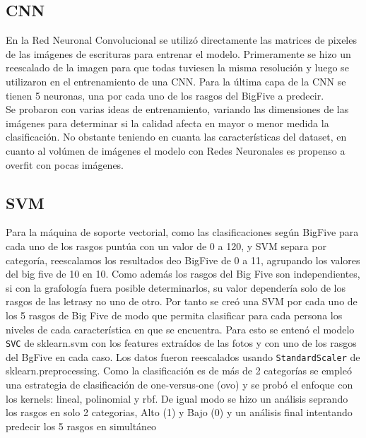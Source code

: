 \documentclass[10pt, a4paper]{article}
\begin{document}
        \subsection{CNN}
            En la Red Neuronal Convolucional se utiliz\'o directamente las matrices de pixeles de las im\'agenes de escrituras para entrenar el modelo. 
            Primeramente se hizo un reescalado de la imagen para que todas tuviesen la misma resoluci\'on y luego se utilizaron en el entrenamiento de una CNN.
            Para la \'ultima capa de la CNN se tienen 5 neuronas, una por cada uno de los rasgos del BigFive a predecir.\\
            
            Se probaron con varias ideas de entrenamiento, variando las dimensiones de las im\'agenes para determinar si la calidad afecta en mayor o menor medida la clasificaci\'on. No obstante teniendo en cuanta las caracter\'isticas del dataset, en cuanto al vol\'umen de im\'agenes el modelo con Redes Neuronales es propenso 
            a overfit con pocas im\'agenes. 
        
        \subsection{SVM}
            Para la m\'aquina de soporte vectorial, como las clasificaciones seg\'un BigFive para cada uno de los rasgos punt\'ua con un valor de 0 a 120, y SVM separa por categor\'ia,
            reescalamos los resultados deo BigFive de 0 a 11, agrupando los valores del big five de 10 en 10. Como adem\'as los rasgos del Big Five son independientes, si con la grafolog\'ia fuera posible determinarlos, su valor depender\'ia solo de los rasgos de las letrasy no uno de otro.
            Por tanto se cre\'o una SVM por cada uno de los 5 rasgos de Big Five de modo que permita clasificar para cada persona los niveles de cada caracter\'istica en que se encuentra. Para esto se enten\'o el modelo \texttt{SVC} de sklearn.svm con los features extra\'idos de las fotos y con uno de los rasgos del BgFive en cada caso.
            Los datos fueron reescalados usando \texttt{StandardScaler} de sklearn.preprocessing.
            Como la clasificaci\'on es de m\'as de 2 categor\'ias se emple\'o una estrategia de clasificaci\'on de one-versus-one (ovo) y se prob\'o el enfoque con los kernels: lineal, polinomial y rbf. De igual modo se hizo un an\'alisis seprando los rasgos en solo 2 categorias, Alto (1) y Bajo (0) y un an\'alisis final intentando predecir 
            los 5 rasgos en simult\'aneo
			
\end{document}
